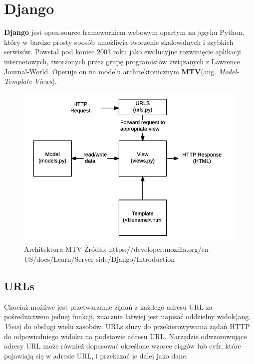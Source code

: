 \documentclass[oneside,polski,logo,indent]{amuthesis}
\begin{document}
\section{Django}
\textbf{Django} jest open-source frameworkiem webowym opartym na języku Python, który  w bardzo prosty sposób umożliwia tworzenie skalowalnych i szybkich serwisów. Powstał pod koniec 2003 roku jako ewolucyjne rozwinięcie aplikacji internetowych, tworzonych przez grupę programistów związanych z Lawrence Journal-World. Operuje on na modelu architektonicznym \textbf{MTV}(ang. \emph{Model-Template-Views}). 

\begin{figure}[H]
\centering
\includegraphics[width=14cm]{mtv.png}
\caption{Architektura MTV\newline
Źródło: https://developer.mozilla.org/en-US/docs/Learn/Server-side/Django/Introduction}
\label{MTV}
\end{figure}

\begin{center}
\subsection{URLs}
\end{center}
Chociaż możliwe jest przetwarzanie żądań z każdego adresu URL za pośrednictwem jednej funkcji, znacznie łatwiej jest napisać oddzielny widok(ang. \emph{View}) do obsługi wielu zasobów. URLs służy do przekierowywania żądań HTTP do odpowiedniego widoku na podstawie adresu URL. Narzędzie odwzorowujące adresy URL może również dopasować określone wzorce ciągów lub cyfr, które pojawiają się w adresie URL, i przekazać je dalej jako dane.
\end{document}
